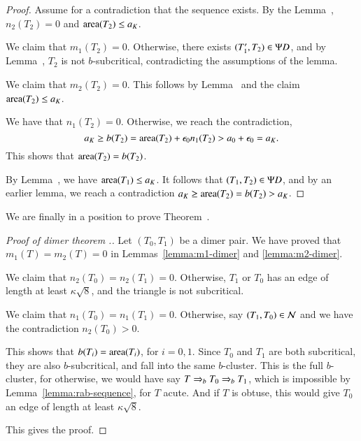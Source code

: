 \begin{proof}  Assume for a contradiction that the sequence exists.  
By the Lemma~, $n_2(T_2)=0$ and ${\operatorname{area}}(T_2)\le a_K$.

We claim that $m_1(T_2)=0$.  Otherwise, there exists $(T'_1,T_2)\in\Psi D$, and by Lemma~,
$T_2$ is not $b$-subcritical, contradicting the assumptions of the lemma.

We claim that $m_2(T_2)=0$.  This follows by Lemma~ and the claim ${\operatorname{area}}(T_2)\le a_K$.

We have that $n_1(T_2)=0$.  Otherwise, we reach the contradiction,
\[
a_K \ge b(T_2) ={\operatorname{area}}(T_2) + \epsilon_0 n_1(T_2) > a_0 + \epsilon_0 = a_K.
\]
This shows that ${\operatorname{area}}(T_2) = b(T_2)$.

By Lemma~, we have ${\operatorname{area}}(T_1)\le a_K$.
It follows that $(T_1,T_2)\in\Psi D$, and by an earlier lemma, 
we reach a contradiction $a_K \ge {\operatorname{area}}(T_2) = b(T_2) > a_K$.
\end{proof}
  
We are finally in a position to prove  Theorem~.

\begin{proof}[Proof of dimer theorem .]
Let $(T_0,T_1)$ be a dimer pair.   We have proved that $m_1(T)=m_2(T)=0$ in Lemmas~\ref{lemma:m1-dimer} and \ref{lemma:m2-dimer}.

We claim that $n_2(T_0)=n_2(T_1)=0$.  Otherwise, $T_1$ or $T_0$ has an edge of length at least $\kappa\sqrt8$, and the triangle
is not subcritical.

We claim that $n_1(T_0)=n_1(T_1)=0$.  Otherwise, say $(T_1,T_0)\in\mathcal N$ and we have the contradiction $n_2(T_0)>0$.

This shows that $b(T_i)={\operatorname{area}}(T_i)$, for $i=0,1$.
Since $T_0$ and $T_1$ are both subcritical, they are also $b$-subcritical, and fall into the same $b$-cluster.
This is the full $b$-cluster, for otherwise, we would have say $T\Rightarrow_{b} T_0\Rightarrow_{b} T_1$, which is impossible by
Lemma~\ref{lemma:rab-sequence}, for $T$ acute.  And if $T$ is obtuse, this would give $T_0$ an edge of length at least $\kappa\sqrt8$.

This gives the proof.
\end{proof}





